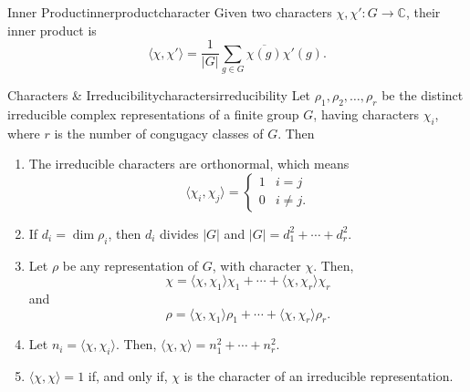 
\begin{defn}{Inner Product}{innerproductcharacter}
	Given two characters \(\chi, \chi' \colon G \to \mathbb{C}\), their inner product is \[
		\langle \chi, \chi' \rangle = \frac{1}{|G|} \sum_{g \in G} \overline{\chi(g)}\chi'(g).
	\] 
\end{defn}

\begin{thm}{Characters \& Irreducibility}{charactersirreducibility}
	Let \(\rho_1, \rho_2, \dots, \rho_r\) be the distinct irreducible complex representations of a finite group \(G\), having characters \(\chi_i\), where \(r\) is the number of congugacy classes of \(G\). Then
	\begin{enumerate}
		\item The irreducible characters are orthonormal, which means \[
				\langle \chi_i, \chi_j \rangle =
				\begin{cases}
					1 & i = j \\
					0 & i \neq j.
				\end{cases}
			\] 
		\item If \(d_i = \dim \rho_i\), then \(d_i\) divides \(|G|\) and \(|G| = d_1^2 + \cdots + d_r^2\).
		\item Let \(\rho\) be any representation of \(G\), with character \(\chi\). Then, \[
				\chi = \langle \chi, \chi_1 \rangle \chi_1 + \cdots + \langle \chi, \chi_r \rangle \chi_r
			\] and \[
				\rho = \langle \chi, \chi_1 \rangle \rho_1 + \cdots + \langle \chi, \chi_r \rangle \rho_r.
			\] 
		\item Let \(n_i = \langle \chi, \chi_i \rangle\). Then, \(\langle \chi, \chi \rangle = n_1^2 + \cdots + n_r^2\).
		\item \(\langle \chi, \chi \rangle = 1\) if, and only if, \(\chi\) is the character of an irreducible representation.
	\end{enumerate}
\end{thm}
